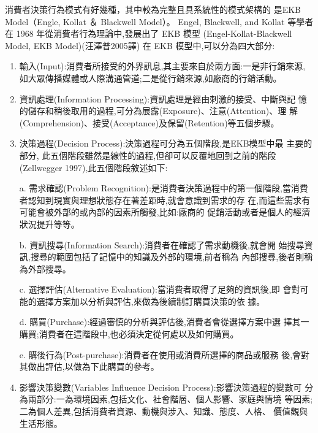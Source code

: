 消費者決策行為模式有好幾種，其中較為完整且具系統性的模式架構的
是EKB Model（Engle, Kollat ＆ Blackwell Model）。
Engel, Blackwell, and Kollat 等學者在 1968 年從消費者行為理論中,發展出了 EKB 模型 (Engel-Kollat-Blackwell Model, EKB Model)(汪澤普2005譯)\cite{汪澤普}
在 EKB 模型中,可以分為四大部分:
\begin{enumerate}
\item 輸入(Input):消費者所接受的外界訊息,其主要來自於兩方面:一是非行銷來源,如大眾傳播媒體或人際溝通管道;二是從行銷來源,如廠商的行銷活動。
\item 資訊處理(Information Processing):資訊處理是經由刺激的接受、中斷與記
憶的儲存和稍後取用的過程,可分為展露(Exposure)、注意(Attention)、理
解(Comprehension)、接受(Acceptance)及保留(Retention)等五個步驟。
\item 決策過程(Decision Process):決策過程可分為五個階段,是EKB模型中最 主要的部分,
此五個階段雖然是線性的過程,但卻可以反覆地回到之前的階段(Zellwegger 1997),此五個階段敘述如下:

a. 需求確認(Problem Recognition):是消費者決策過程中的第一個階段,當消費者認知到現實與理想狀態存在著差距時,就會意識到需求的存 在,而這些需求有可能會被外部的或內部的因素所觸發,比如:廠商的 促銷活動或者是個人的經濟狀況提升等等。

b. 資訊搜尋(Information Search):消費者在確認了需求動機後,就會開 始搜尋資訊,搜尋的範圍包括了記憶中的知識及外部的環境,前者稱為 內部搜尋,後者則稱為外部搜尋。

c. 選擇評估(Alternative Evaluation):當消費者取得了足夠的資訊後,即 會對可能的選擇方案加以分析與評估,來做為後續制訂購買決策的依 據。

d. 購買(Purchase):經過審慎的分析與評估後,消費者會從選擇方案中選 擇其一購買;消費者在這階段中,也必須決定從何處以及如何購買。

e. 購後行為(Post-purchase):消費者在使用或消費所選擇的商品或服務 後,會對其做出評估,以做為下此購買的參考。

\item 影響決策變數(Variables Influence Decision Process):影響決策過程的變數可 分為兩部分:一為環境因素,包括文化、社會階層、個人影響、家庭與情境 等因素;二為個人差異,包括消費者資源、動機與涉入、知識、態度、人格、 價值觀與生活形態。
\end{enumerate}



